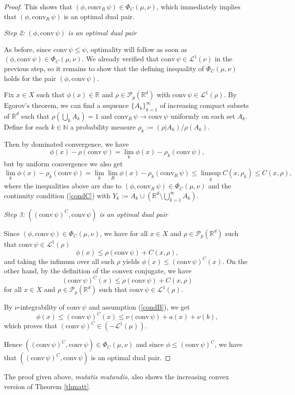 \documentclass[reqno, a4paper]{amsart}
\newcommand{\conv}{\mathrm{conv}\,}
\newcommand{\convr}{\mathrm{conv}_R\,}
\newcommand{\cP}{\mathcal{P}}
\renewcommand{\P}{\cP}
\newcommand{\R}{\mathbb R}
\theoremstyle{definition}
\theoremstyle{definition}
\theoremstyle{definition}
\begin{document}
\begin{proof}
This shows that $(\phi,\convr\psi)\in\Phi_C(\mu,\nu)$, which immediately implies that $(\phi,\convr\psi)$ is an optimal dual pair.


\textit{Step 2:} $(\phi,\conv\psi) $ \textit{is an optimal dual pair}

\noindent
As before, since $\conv\psi\leq\psi$, optimality will follow as soon as $(\phi,\conv\psi)\in\Phi_C(\mu,\nu)$. We already verified that $\conv\psi\in\mathcal L^1(\nu)$ in the previous step, so it remains to show that the defining inequality of $\Phi_C(\mu,\nu)$ holds for the pair $(\phi,\conv\psi)$.

Fix $x\in X$ such that $\phi(x)\in\R$ and $\rho \in \P_p(\R^d)$ with $\conv\psi \in \mathcal L^1(\rho)$. By Egorov's theorem, we can find a sequence $\{A_k\}^{\infty}_{k=1}$ of increasing compact subsets of $\R^d$ such that $\rho(\bigcup_kA_k)=1$ and $\convr\psi\to\conv\psi$ uniformly on each set $A_k$. Define for each $k\in\mathbb N$ a probability measure $\rho_k:=(\rho|{A_k}) / \rho(A_k).$

Then by dominated convergence, we have
$$\phi(x)-\rho(\conv\psi)=\lim_k\phi(x)-\rho_k(\conv\psi),$$
but by uniform convergence we also get
$$\lim_k\phi(x)-\rho_k(\conv\psi)=\lim_k \lim_R\phi(x)-\rho_k(\convr\psi)\leq \limsup_k C(x,\rho_k)\leq C(x,\rho),$$
where the inequalities above are due to $(\phi,\convr\psi)\in\Phi_C(\mu,\nu)$ and the continuity condition (\ref{condC}) with $Y_k:=A_k\cup(\R^d\setminus\bigcup_{k=1}^\infty A_k)$.

\textit{Step 3:} $((\conv\psi)^C,\conv\psi) $ \textit{is an optimal dual pair}

\noindent
Since $(\phi,\conv\psi)\in\Phi_C(\mu,\nu)$, we have for all $x\in X$ and $\rho \in \P_p(\R^d)$ such that $\conv\psi \in\mathcal L^1(\rho)$ 
$$\phi(x)\leq \rho(\conv\psi)+C(x,\rho),$$
and taking the infimum over all such $\rho$ yields $\phi(x)\leq (\conv \psi)^C(x)$. On the other hand, by the definition of the convex conjugate, we have 
$$(\conv\psi)^C(x)\leq \rho(\conv\psi)+C(x,\rho)$$
for all $x\in X$ and $\rho\in\P_p(\R^d)$ such that $\conv \psi \in \mathcal L^1(\rho)$. %

By $\nu$-integrability of $\conv\psi$  and assumption (\ref{condB}), we get
$$\phi(x)\leq(\conv\psi)^C(x)\leq \nu(\conv\psi)+a(x)+\nu(b),$$
 which proves that $(\conv\psi)^C\in(-\mathcal L^1(\mu))$. 
 
 Hence $((\conv\psi)^C,\conv\psi)\in \Phi_C(\mu,\nu)$ and since $\phi\leq (\conv\psi)^C$, we have that $((\conv\psi)^C,\conv \psi)$ is an optimal dual pair.


 
\end{proof}
The proof given above, \textit{mutatis mutandis}, also shows the increasing convex version of Theorem \ref{thmatt}.
\end{document}
